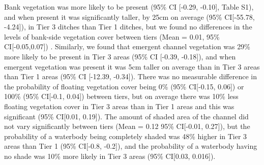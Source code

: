 \documentclass[lineno,sn-basic]{sn-jnl}%
\begin{document}
Bank vegetation was more likely to be present (95\% CI [-0.29, -0.10], Table S1), and when present it was significantly taller, by 25cm on average (95\% CI[-55.78, -4.24]), in Tier 3 ditches than Tier 1 ditches, but we found no differences in the levels of bank-side vegetation cover between tiers (Mean = 0.01, 95\% CI[-0.05,0.07]) . Similarly, we found that emergent channel vegetation was 29\% more likely to be present in Tier 3 areas (95\% CI [-0.39, -0.18]), and when emergent vegetation was present it was 5cm taller on average than in Tier 3 areas than Tier 1 areas (95\% CI [-12.39, -0.34]). There was no measurable difference in the probability of floating vegetation cover being 0\% (95\% CI[-0.15, 0.06]) or 100\% (95\% CI[-0.1, 0.04]) between tiers, but on average there was 10\% less floating vegetation cover in Tier 3 areas than in Tier 1 areas and this was significant (95\% CI[0.01, 0.19]). The amount of shaded area of the channel did not vary significantly between tiers (Mean = 0.12 95\% CI[-0.01, 0.27]), but the probability of a waterbody being completely shaded was 48\% higher in Tier 3 areas than Tier 1 (95\% CI[-0.8, -0.2]), and the probability of a waterbody having no shade was 10\% more likely in Tier 3 areas (95\% CI[0.03, 0.016]). 
\end{document}
